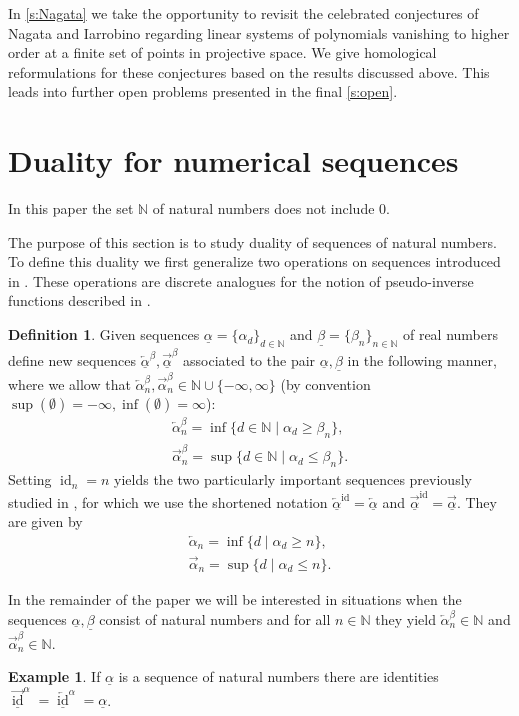 \documentclass[12pt, reqno]{amsart}
\numberwithin{equation}{section}
\def\a{\ensuremath{\alpha}}
\def\ua{\ensuremath{\underline{\alpha}}}
\def\b{\ensuremath{\beta}}
\def\ub{\ensuremath{\underline{\beta}}}
\newcommand{\N}{{\mathbb N}}
\def\id{{\operatorname{id}}}
\theoremstyle{plain} %
\theoremstyle{definition}
\newtheorem{defn}[thm]{Definition}
\newtheorem{ex}[thm]{Example}
\theoremstyle{remark}
\newcommand{\uao}{\overleftarrow{\ua}}
\newcommand{\uau}{\overrightarrow{\ua}}
\newcommand{\ao}{\overleftarrow{\alpha}}
\newcommand{\au}{\overrightarrow{\alpha}}
\begin{document}
In \cref{s:Nagata} we take the opportunity to revisit the celebrated conjectures of Nagata and Iarrobino regarding linear systems of polynomials vanishing to higher order at a finite set of points in projective space. We give homological reformulations for these conjectures based on the results discussed above. This leads into further open problems presented in the final \cref{s:open}.

\section{Duality for numerical sequences}\label{s:1}
\label{s:sequences}
In this paper the set $\N$ of natural numbers does not include 0.

The purpose of this section is to study duality of sequences of natural numbers. To define this duality we first generalize two operations on sequences introduced in \cite{Johnson11}. These operations are discrete analogues for the notion of  pseudo-inverse functions described in \cite{Osterdal06}.


\begin{defn}
\label{def:overunder}
Given sequences $\ua=\{\alpha_d\}_{d\in \N}$ and $\ub=\{\b_n\}_{n\in \N}$ of real numbers 
define new sequences $\uao^\b, \uau^\b$ 
associated to the pair $\ua, \ub$ in the following manner, where we allow that $\ao^\b_n, \au^\b_n\in \N\cup\{-\infty, \infty\}$ (by convention $\sup(\emptyset)=-\infty, \inf(\emptyset)=\infty$):
 \begin{eqnarray*}
 \ao^\b_n=\inf\{d \in \N \mid \alpha_d\geq \b_n\},\\
\au^\b_n=\sup\{d \in \N \mid \alpha_d\leq \b_n\}.
\end{eqnarray*}
Setting $\id_n=n$ yields the two particularly important  sequences previously studied in \cite{Johnson11}, for which we use the shortened notation $\uao^\id=\uao$ and $\uau^\id=\uau$. They are given by
 \begin{eqnarray*}
 \ao_n=\inf\{d\mid \alpha_d\geq n\},\\
\au_n=\sup\{d\mid \alpha_d\leq n\}.
\end{eqnarray*}
\end{defn}

In the remainder of the paper we will be interested  in situations when the sequences $\ua, \ub$ consist of natural numbers and for all $n\in \N$ they yield $\ao^\b_n\in \N$ and $\au^\b_n\in \N$. 
\begin{ex}
If $\ua$ is a sequence of natural numbers there are identities $\overrightarrow{\underline{\id}}^\a=\overleftarrow{\underline{\id}}^\a=\ua$.  
\end{ex}
\end{document}
